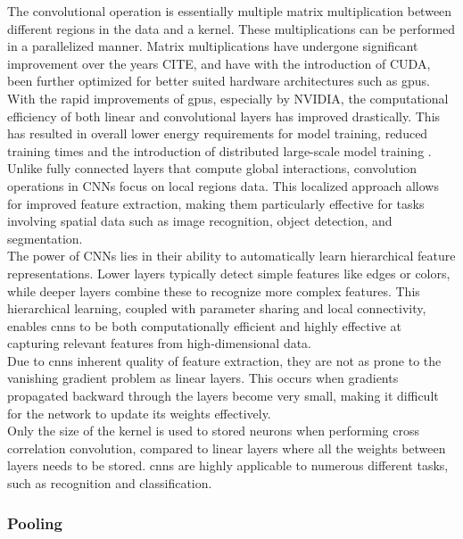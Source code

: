 The convolutional operation is essentially multiple matrix multiplication between different regions in the data and a kernel. These multiplications can be performed in a parallelized manner. Matrix multiplications have undergone significant improvement over the years CITE, and have with the introduction of CUDA, been further optimized for better suited hardware architectures such as \acrshort{gpu}s. With the rapid improvements of \acrshort{gpu}s, especially by NVIDIA, the computational efficiency of both linear and convolutional layers has improved drastically. This has resulted in overall lower energy requirements for model training, reduced training times and the introduction of distributed large-scale model training \cite{mungoli2023scalable}. \\ 

Unlike fully connected layers that compute global interactions, convolution operations in CNNs focus on local regions data. This localized approach allows for improved feature extraction, making them particularly effective for tasks involving spatial data such as image recognition, object detection, and segmentation. \\


The power of CNNs lies in their ability to automatically learn hierarchical feature representations. Lower layers typically detect simple features like edges or colors, while deeper layers combine these to recognize more complex features. This hierarchical learning, coupled with parameter sharing and local connectivity, enables \acrshort{cnn}s to be both computationally efficient and highly effective at capturing relevant features from high-dimensional data. \\

Due to \acrshort{cnn}s inherent quality of feature extraction, they are not as prone to the vanishing gradient problem \cite{tan2019vanishing} as linear layers. This occurs when gradients propagated backward through the layers become very small, making it difficult for the network to update its weights effectively. \\

Only the size of the kernel is used to stored neurons when performing cross correlation convolution, compared to linear layers where all the weights between layers needs to be stored. \acrshort{cnn}s are highly applicable to numerous different tasks, such as recognition and classification. \\

\subsubsection{Pooling}

